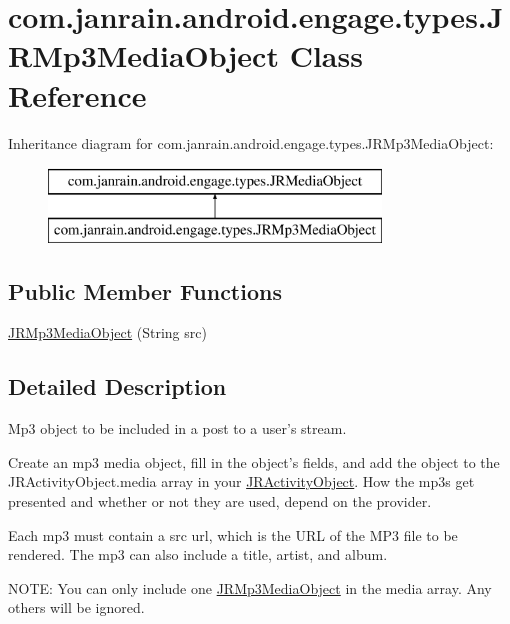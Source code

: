 \hypertarget{classcom_1_1janrain_1_1android_1_1engage_1_1types_1_1_j_r_mp3_media_object}{
\section{com.janrain.android.engage.types.JRMp3MediaObject Class Reference}
\label{classcom_1_1janrain_1_1android_1_1engage_1_1types_1_1_j_r_mp3_media_object}
}
Inheritance diagram for com.janrain.android.engage.types.JRMp3MediaObject:\begin{figure}[H]
\begin{center}
\leavevmode
\includegraphics[height=2.000000cm]{classcom_1_1janrain_1_1android_1_1engage_1_1types_1_1_j_r_mp3_media_object}
\end{center}
\end{figure}
\subsection*{Public Member Functions}
\begin{DoxyCompactItemize}
\item 
\hyperlink{classcom_1_1janrain_1_1android_1_1engage_1_1types_1_1_j_r_mp3_media_object_af2c4460d98fa407eeb35d46ad72218ee}{JRMp3MediaObject} (String src)
\end{DoxyCompactItemize}


\subsection{Detailed Description}
Mp3 object to be included in a post to a user's stream.

Create an mp3 media object, fill in the object's fields, and add the object to the JRActivityObject.media array in your \hyperlink{classcom_1_1janrain_1_1android_1_1engage_1_1types_1_1_j_r_activity_object}{JRActivityObject}. How the mp3s get presented and whether or not they are used, depend on the provider.

Each mp3 must contain a src url, which is the URL of the MP3 file to be rendered. The mp3 can also include a title, artist, and album.

NOTE: You can only include one \hyperlink{classcom_1_1janrain_1_1android_1_1engage_1_1types_1_1_j_r_mp3_media_object}{JRMp3MediaObject} in the media array. Any others will be ignored.

